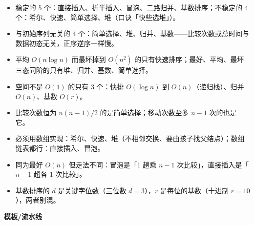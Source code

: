\documentclass[10pt,a4paper]{ctexart}
\begin{document}
\begin{itemize}

\item 稳定的 5 个：直接插入、折半插入、冒泡、二路归并、基数排序；不稳定的 4 个：希尔、快速、简单选择、堆（口诀「快些选堆」）。

\item 与初始序列无关的 4 个：简单选择、堆、归并、基数——比较次数或总时间与数据初态无关，正序逆序一样慢。

\item 平均 $O(n\log n)$ 而最坏掉到 $O(n^2)$ 的只有快速排序；最好、平均、最坏三态同阶的只有堆、归并、基数、简单选择。

\item 空间不是 $O(1)$ 的只有 3 个：快排 $O(\log n)$ 到 $O(n)$（递归栈）、归并 $O(n)$、基数 $O(r)$。

\item 比较次数恒为 $n(n-1)/2$ 的是简单选择；移动次数至多 $n-1$ 次的也是它。

\item 必须用数组实现：希尔、快速、堆（不相邻交换、要由孩子找父结点）；数组链表都行：直接插入、冒泡。

\item 同为最好 $O(n)$ 但走法不同：冒泡是「1 趟乘 $n-1$ 次比较」，直接插入是「$n-1$ 趟各 1 次比较」。

\item 基数排序的 $d$ 是关键字位数（三位数 $d=3$），$r$ 是每位的基数（十进制 $r=10$），两者别混。

\end{itemize}

\textbf{模板/流水线}
\end{document}
